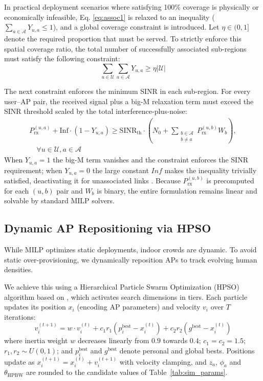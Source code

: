 \documentclass[conference]{IEEEtran}
\begin{document}
	In practical deployment scenarios where satisfying 100\% coverage is physically or economically infeasible, Eq. \eqref{eq:assoc1} is relaxed to an inequality ($\sum_{a \in \mathcal{A}} Y_{u,a} \le 1$), and a global coverage constraint is introduced. Let $\eta \in (0,1]$ denote the required proportion that must be served. To strictly enforce this spatial coverage ratio, the total number of successfully associated sub-regions must satisfy the following constraint:
	\begin{equation}
		\sum_{u \in \mathcal{U}} \sum_{a \in \mathcal{A}} Y_{u,a} \ge \eta |\mathcal{U}|
		\label{eq:coverage_constraint}
	\end{equation}

	The next constraint enforces the minimum SINR in each sub-region. For every user--AP pair, the received signal plus a big-M relaxation term must exceed the SINR threshold scaled by the total interference-plus-noise:
	\begin{equation}
		\begin{split}
			P_{\text{rx}}^{(u,a)} + \text{Inf} \cdot (1 - Y_{u,a}) \ge \text{SINR}_{\text{th}} \cdot \left( N_0 + \sum_{\substack{b \in \mathcal{A} \\ b \ne a}} P_{\text{rx}}^{(u,b)} W_b \right), \\
			\quad \forall u \in \mathcal{U}, a \in \mathcal{A}
		\end{split}
		\label{eq:sinr}
	\end{equation}
	When $Y_{u,a}=1$ the big-M term vanishes and the constraint enforces the SINR requirement; when $Y_{u,a}=0$ the large constant $\textit{Inf}$ makes the inequality trivially satisfied, deactivating it for unassociated links \cite{b4}. Because $P_{\text{rx}}^{(u,b)}$ is precomputed for each $(u,b)$ pair and $W_b$ is binary, the entire formulation remains linear and solvable by standard MILP solvers.

	\subsection{Dynamic AP Repositioning via HPSO}

	While MILP optimizes static deployments, indoor crowds are dynamic. To
	avoid static over-provisioning, we dynamically reposition APs to track
	evolving human densities.

	We achieve this using a Hierarchical Particle Swarm Optimization (HPSO)
	algorithm based on \cite{b11,b13}, which activates search dimensions in
	tiers. Each particle updates its position $x_i$ (encoding AP parameters)
	and velocity $v_i$ over $T$ iterations:
	\begin{equation}
		v_i^{(t+1)} = w \cdot v_i^{(t)} + c_1 r_1 (p_i^{\text{best}} -
		x_i^{(t)}) + c_2 r_2 (g^{\text{best}} - x_i^{(t)})
		\label{eq:pso_velocity}
	\end{equation}
	where inertia weight $w$ decreases linearly from $0.9$ towards $0.4$; $c_1 = c_2
	= 1.5$; $r_1, r_2 \sim U(0,1)$; and $p_i^{\text{best}}$ and
	$g^{\text{best}}$ denote personal and global bests. Positions update as
	$x_i^{(t+1)} = x_i^{(t)} + v_i^{(t+1)}$ with velocity clamping, and $z_a$, $\phi_a$ and $\theta_{\text{HPBW}}$ are rounded to the candidate values of Table~\ref{tab:sim_params}.
\end{document}

